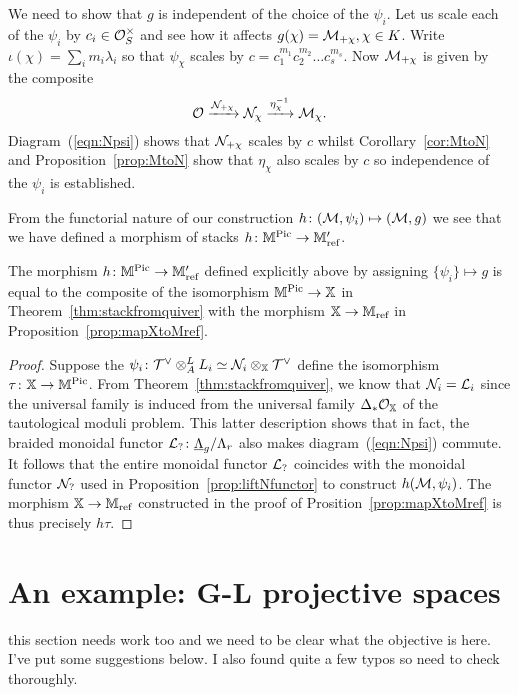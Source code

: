 \documentclass[12pt]{amsart}
\begin{document}
We need to show that $g$ is independent of the choice of the $\psi_i$. Let us scale each of the $\psi_i$ by $c_i \in \mathcal{O}_S^{\times}$ and see how it affects $g(\chi) = \mathcal{M}_{+\chi}, \chi \in K$. Write $\iota(\chi) = \sum_i m_i \lambda_i$ so that $\psi_{\chi}$ scales by $c = c_1^{m_1} c_2^{m_2} \ldots c_s^{m_s}$. Now $\mathcal{M}_{+\chi}$ is given by the composite
$$ \mathcal{O} \xrightarrow{\mathcal{N}_{+\chi}} \mathcal{N}_{\chi} \xrightarrow{\eta^{-1}_{\chi}} \mathcal{M}_{\chi}.$$
Diagram~(\ref{eqn:Npsi}) shows that $\mathcal{N}_{+\chi}$ scales by $c$ whilst Corollary~\ref{cor:MtoN} and Proposition~\ref{prop:MtoN} show that $\eta_{\chi}$ also scales by $c$ so independence of the $\psi_i$ is established. 

From the functorial nature of our construction $h \colon  (\mathcal{M},\psi_i) \mapsto (\mathcal{M},g)$ we see that we have defined a morphism of stacks $h\colon \mathbb{M}^{\operatorname{Pic}} \to \mathbb{M}'_{\text{ref}}$. 

\begin{theorem}
The morphism $h\colon\mathbb{M}^{\operatorname{Pic}} \to \mathbb{M}'_{\text{ref}}$ defined explicitly above by assigning $\{\psi_i\} \mapsto g$ is equal to the composite of the isomorphism $\mathbb{M}^{\operatorname{Pic}} \to \mathbb{X}$ in Theorem~\ref{thm:stackfromquiver} with the morphism $\mathbb{X} \to \mathbb{M}_{\text{ref}}$ in Proposition~\ref{prop:mapXtoMref}.
\end{theorem}
\begin{proof}
Suppose the $\psi_i \colon \mathcal{T}^{\vee} \otimes_A^L L_i \simeq \mathcal{N}_i \otimes_{\mathbb{X}} \mathcal{T}^{\vee}$ define the isomorphism $\tau \colon \mathbb{X} \to \mathbb{M}^{\operatorname{Pic}}$. From Theorem~\ref{thm:stackfromquiver}, we know that $\mathcal{N}_i = \mathcal{L}_i$ since the universal family is induced from the universal family $\Delta_* \mathcal{O}_{\mathbb{X}}$ of the tautological moduli problem. This latter description shows that in fact, the braided monoidal functor $\mathcal{L}_? \colon \underline{\Lambda}_g/\Lambda_r$ also makes diagram~(\ref{eqn:Npsi}) commute. It follows that the entire monoidal functor $\mathcal{L}_?$ coincides with the monoidal functor $\mathcal{N}_?$ used in Proposition~\ref{prop:liftNfunctor} to construct $h(\mathcal{M},\psi_i)$. The morphism $\mathbb{X} \to \mathbb{M}_{\text{ref}}$ constructed in the proof of Prosition~\ref{prop:mapXtoMref} is thus precisely $h\tau$. 
\end{proof}

\section{An example: G-L projective spaces} \label{sec:HIMO}

{\red this section needs work too and we need to be clear what the objective is here. I've put some suggestions below. I also found quite a few typos so need to check thoroughly.}
\end{document}
